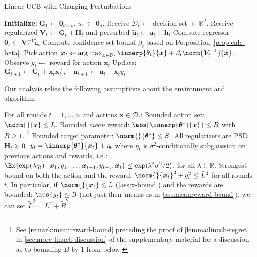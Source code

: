 \documentclass{article}
\renewcommand{\vec}[1]{\bm{#1}}
\newcommand{\inv}[1]{#1^{-1}}
\newcommand{\Real}{\mathds{R}}
\newcommand{\argmax}{\operatorname*{arg\,max}}
\newcommand\given[1][\delimsize]{%
  \providecommand{\delimsize}{}
  \nonscript\:#1\vert\allowbreak\nonscript\:\mathopen{}
}
\DeclarePairedDelimiter{\abs}||
\newcommand{\D}{\mathcal{D}}
\providecommand\transp{\top}
\let\transpsymbol\transp
\renewcommand{\transp}[1]{#1^\transpsymbol}
\newenvironment{assumptions*}[2][]{%
  \begin{assumptions}[#1]
    #2
    \begin{enumerate}[nolistsep]
      \setcounter{enumi}{\theassumption}
      \newcommand{\assume}[1][]{\item\label[assumption]{##1}}
    }{
      \setcounter{assumption}{\theenumi}
    \end{enumerate}
  \end{assumptions}%
}
\begin{document}
\begin{algorithm}[h]
  \caption{Linear UCB with Changing Perturbations}\label{alg:linucb}
  \begin{algorithmic}
    \State \textbf{Initialize:} $\vec G_1 \gets \vec 0_{d\times d}$,
    $u_1\gets \vec 0_{d}$.
    \State Receive $\D_t \gets{}$ decision set ${} \subset \Real^d$.
    \State Receive regularized $\vec V_t \gets \vec G_t + \vec H_t$ and perturbed $\tilde{\vec u}_t \gets \vec u_t + \vec h_t$
    \State Compute regressor $\tilde{\vec\theta}_{t} \gets \inv{\vec V_{t}}\tilde{\vec u}_{t}$
    \State Compute confidence-set bound $\beta_t$ based on Porposition~\ref{prop:calc-beta}.
    \State Pick action $\vec x_t \gets \argmax_{\vec x\in\D_t}
    \innerp{\tilde{\vec \theta}_t}{\vec x} +
    \beta_t\norm{\inv{\vec V_t}}{\vec x}$.
    \State Observe $y_t \gets {}$ reward for action $\vec x_t$
    \State Update: $\vec G_{t+1} \gets \vec G_{t} + \vec x_t \transp{\vec x_t},
    \quad \vec u_{t+1} \gets \vec u_{t} + \vec x_t y_t$
    \EndFor
  \end{algorithmic}
\end{algorithm}

Our analysis relies the following assumptions about the environment
and algorithm:
\begin{assumptions*}{%
    For all rounds $t=1,\dotsc,n$ and actions $\vec x\in\D_t$:}
   Bounded action set: $\norm{}{\vec x} \le L$.
   Bounded \emph{mean} reward:
  $\abs{\innerp{\vec\theta^*}{\vec x}} \le B$ with $B\ge 1$.%
  \footnote{See \cref{remark:meanreward-bound} preceding the proof of
    \cref{lemma:linucb-regret} in \cref{sec:more-linucb-discussion} of
    the supplementary material for a discussion as to bounding $B$ by $1$ from below.} %
   Bounded target parameter:
  $\norm{}{\vec\theta^*} \le S$.   All
  regularizers are PSD $\vec H_t \succeq 0$.  
  $y_t = \innerp{\vec\theta^*}{\vec x_t} + \eta_t$ where $\eta_t$ is
  $\sigma^2$-conditionally subgaussian on previous actions and
  rewards, i.e.:
    $\Ex{\exp(\lambda\eta_t) \given \vec x_1, y_1, \dotsc, \vec x_{t-1}, y_{t-1}, \vec x_t}
    \le \exp(\lambda^2\sigma^2/2)$, for all $\lambda\in\Real$.
  Strongest bound on both the action and the reward:
  $\norm{}{\vec x_t}^2 + y_t^2 \le \tilde L^2$ for all rounds $t$.  In
  particular, if $\norm{}{\vec x_t} \le L$ (\cref{ass:x-bound}) and
  the rewards are bounded: $\abs{y_t} \le \tilde B$ (not just their
  means as in \cref{ass:meanreward-bound}), we can set $\tilde L^2 = L^2 + \tilde B^2$.
\end{assumptions*}
\end{document}
